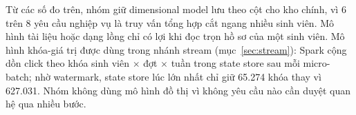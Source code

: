Từ các số đo trên, nhóm giữ dimensional model lưu theo cột cho kho chính, vì 6 trên 8 yêu cầu nghiệp vụ là truy vấn tổng hợp cắt ngang nhiều sinh viên. Mô hình tài liệu hoặc dạng lồng chỉ có lợi khi đọc trọn hồ sơ của một sinh viên. Mô hình khóa-giá trị được dùng trong nhánh stream (mục~\ref{sec:stream}): Spark cộng dồn click theo khóa sinh viên $\times$ đợt $\times$ tuần trong state store sau mỗi micro-batch; nhờ watermark, state store lúc lớn nhất chỉ giữ 65.274 khóa thay vì 627.031. Nhóm không dùng mô hình đồ thị vì không yêu cầu nào cần duyệt quan hệ qua nhiều bước.